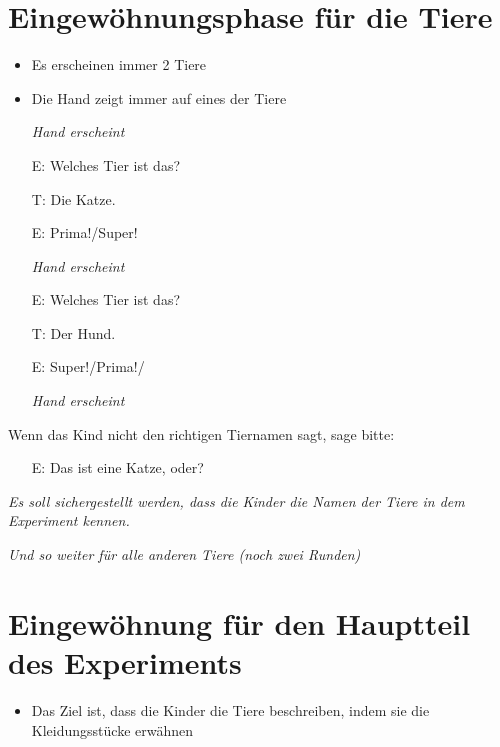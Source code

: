 \documentclass[11pt, oneside]{article}   	%
\begin{document}
\section{Eingew\"ohnungsphase f\"ur die Tiere}
\begin{itemize}
\item Es erscheinen immer 2 Tiere
\item Die Hand zeigt immer auf eines der Tiere
\end{itemize}


\begin{itemize}
\item[] {\it Hand erscheint}
\item [E:] Welches Tier ist das?
\item [T:] Die Katze.
\item [E:] Prima!/Super!
\item[] {\it Hand erscheint}
\item [E:] Welches Tier ist das?
\item [T:] Der Hund.
\item [E:] Super!/Prima!/
\item[] {\it Hand erscheint}
\end{itemize}

Wenn das Kind nicht den richtigen Tiernamen sagt, sage bitte:
\begin{itemize}
\item [E:] Das ist eine Katze, oder?
\end{itemize}
\item [] \textit{Es soll sichergestellt werden, dass die Kinder die Namen der Tiere in dem Experiment kennen.}

\item [] \textit{Und so weiter f\"ur alle anderen Tiere (noch zwei Runden)}


\section{Eingew\"ohnung f\"ur den Hauptteil des Experiments}

\begin{itemize}
\item Das Ziel ist, dass die Kinder die Tiere beschreiben, indem sie die Kleidungsst\"ucke erw\"ahnen 
\end{itemize}
\end{document}
